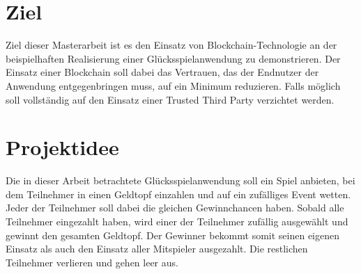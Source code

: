 \section{Ziel}
Ziel dieser Masterarbeit ist es den Einsatz von Blockchain-Technologie an der beispielhaften Realisierung einer Glücksspielanwendung zu demonstrieren. Der Einsatz einer Blockchain soll dabei das Vertrauen, das der Endnutzer der Anwendung entgegenbringen muss, auf ein Minimum reduzieren. Falls möglich soll vollständig auf den Einsatz einer Trusted Third Party verzichtet werden.




\section{Projektidee}
Die in dieser Arbeit betrachtete Glücksspielanwendung soll ein Spiel anbieten, bei dem Teilnehmer in einen Geldtopf einzahlen und auf ein zufälliges Event wetten. Jeder der Teilnehmer soll dabei die gleichen Gewinnchancen haben. Sobald alle Teilnehmer eingezahlt haben, wird einer der Teilnehmer zufällig ausgewählt und gewinnt den gesamten Geldtopf. Der Gewinner bekommt somit seinen eigenen Einsatz als auch den Einsatz aller Mitspieler ausgezahlt. Die restlichen Teilnehmer verlieren und gehen leer aus.\\\\

